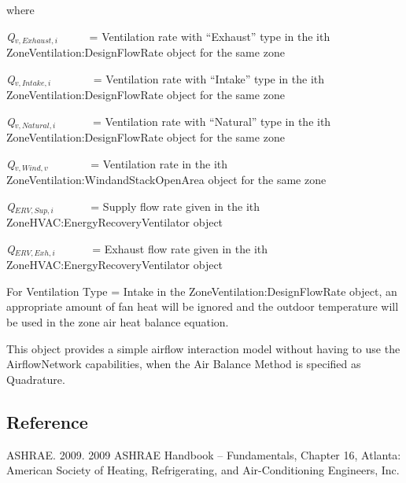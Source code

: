 where

\emph{Q\(_{v,Exhaust,i}\)}~~~~~ = Ventilation rate with ``Exhaust'' type in the ith ZoneVentilation:DesignFlowRate object for the same zone

\emph{Q\(_{v,Intake,i}\)}~~~~~~~ = Ventilation rate with ``Intake'' type in the ith ZoneVentilation:DesignFlowRate object for the same zone

\emph{Q\(_{v,Natural,i}\)}~~~~~~ = Ventilation rate with ``Natural'' type in the ith ZoneVentilation:DesignFlowRate object for the same zone

\emph{Q\(_{v,Wind,v}\)}~~~~~~~ = Ventilation rate in the ith ZoneVentilation:WindandStackOpenArea object for the same zone

\emph{Q\(_{ERV,Sup,i}\)}~~~~~~ = Supply flow rate given in the ith ZoneHVAC:EnergyRecoveryVentilator object

\emph{Q\(_{ERV,Exh,i}\)}~~~~~~ = Exhaust flow rate given in the ith ZoneHVAC:EnergyRecoveryVentilator object

For Ventilation Type = Intake in the ZoneVentilation:DesignFlowRate object, an appropriate amount of fan heat will be ignored and the outdoor temperature will be used in the zone air heat balance equation.

This object provides a simple airflow interaction model without having to use the AirflowNetwork capabilities, when the Air Balance Method is specified as Quadrature.

\subsection{Reference}\label{reference}

ASHRAE. 2009. 2009 ASHRAE Handbook -- Fundamentals, Chapter 16, Atlanta: American Society of Heating, Refrigerating, and Air-Conditioning Engineers, Inc.
